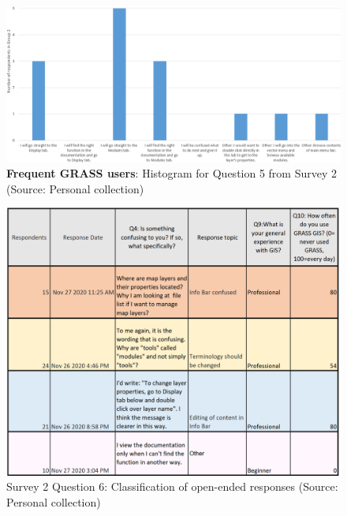 \documentclass[a4paper,10pt,twoside]{article}
\begin{document}
\newpage
\begin{figure}[hbt!] 
\begin{center}
\includegraphics[width=17cm]{../surveys/analyzed_data/survey2_question5_histogram_group2.png} 
\caption[\textbf{Frequent GRASS users}: Histogram for Question 5 from Survey 2]{\textbf{Frequent GRASS users}: Histogram for Question 5 from Survey 2 (Source: Personal collection)}
\label{fig:survey2_question5_histogram_group2}
\end{center}
\end{figure}

\begin{figure}[hbt!] 
\begin{center}
\includegraphics[width=14.5cm]{../surveys/analyzed_data/survey2_question6.png} 
\caption[Survey 2 Question 6: Classification of open-ended responses]{Survey 2 Question 6: Classification of open-ended responses (Source: Personal collection)}
\label{fig:survey2_question6}
\end{center}
\end{figure}
\end{document}
